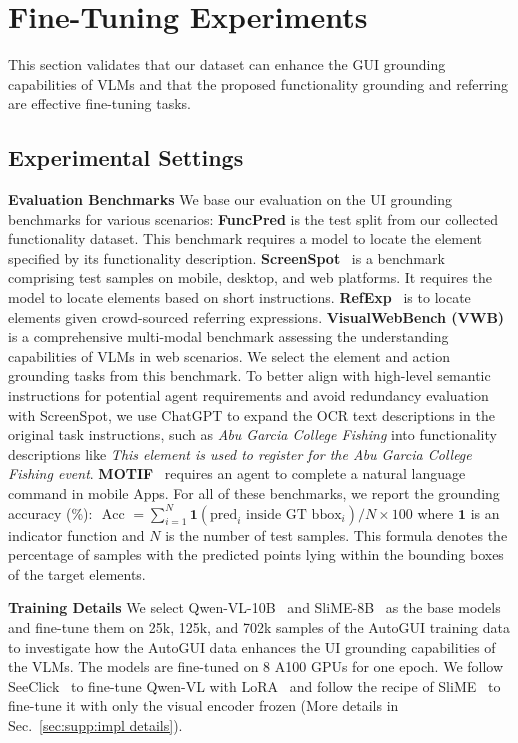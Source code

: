 

\section{Fine-Tuning Experiments}
This section validates that our dataset can enhance the GUI grounding capabilities of VLMs and that the proposed functionality grounding and referring are effective fine-tuning tasks.
\subsection{Experimental Settings}
\noindent\textbf{Evaluation Benchmarks} We base our evaluation on the UI grounding benchmarks for various scenarios: \textbf{FuncPred} is the test split from our collected functionality dataset. This benchmark requires a model to locate the element specified by its functionality description. \textbf{ScreenSpot}~\citep{cheng2024seeclick} is a benchmark comprising test samples on mobile, desktop, and web platforms. It requires the model to locate elements based on short instructions. \textbf{RefExp}~\citep{Bai2021UIBertLG} is to locate elements given crowd-sourced referring expressions. \textbf{VisualWebBench (VWB)}~\citep{liu2024visualwebbench} is a comprehensive multi-modal benchmark assessing the understanding capabilities of VLMs in web scenarios. We select the element and action grounding tasks from this benchmark. To better align with high-level semantic instructions for potential agent requirements and avoid redundancy evaluation with ScreenSpot, we use ChatGPT to expand the OCR text descriptions in the original task instructions, such as \textit{Abu Garcia College Fishing} into functionality descriptions like \textit{This element is used to register for the Abu Garcia College Fishing event}.
\textbf{MOTIF}~\citep{Burns2022ADF} requires an agent to complete a natural language command in mobile Apps.
For all of these benchmarks, we report the grounding accuracy (\%): $\text { Acc }= \sum_{i=1}^N \mathbf{1}\left(\text {pred}_i \text { inside GT } \text {bbox}_i\right) / N \times 100 $ where $\mathbf{1}$ is an indicator function and $N$ is the number of test samples. This formula denotes the percentage of samples with the predicted points lying within the bounding boxes of the target elements.

\noindent\textbf{Training Details}
We select Qwen-VL-10B~\citep{bai2023qwen} and SliME-8B~\citep{slime} as the base models and fine-tune them on 25k, 125k, and 702k samples of the AutoGUI training data to investigate how the AutoGUI data enhances the UI grounding capabilities of the VLMs. The models are fine-tuned on 8 A100 GPUs for one epoch. We follow SeeClick~\citep{cheng2024seeclick} to fine-tune Qwen-VL with LoRA~\citep{hu2022lora} and follow the recipe of SliME~\citep{slime} to fine-tune it with only the visual encoder frozen (More details in Sec.~\ref{sec:supp:impl details}).

